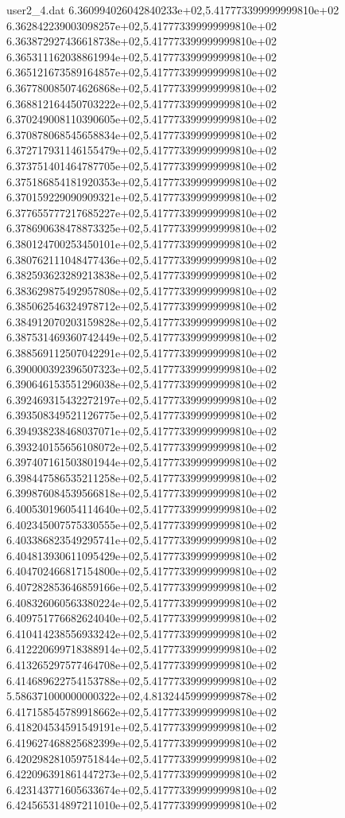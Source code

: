 \begin{filecontents}{user2_4.dat}
6.360994026042840233e+02,5.417773399999999810e+02
6.362842239003098257e+02,5.417773399999999810e+02
6.363872927436618738e+02,5.417773399999999810e+02
6.365311162038861994e+02,5.417773399999999810e+02
6.365121673589164857e+02,5.417773399999999810e+02
6.367780085074626868e+02,5.417773399999999810e+02
6.368812164450703222e+02,5.417773399999999810e+02
6.370249008110390605e+02,5.417773399999999810e+02
6.370878068545658834e+02,5.417773399999999810e+02
6.372717931146155479e+02,5.417773399999999810e+02
6.373751401464787705e+02,5.417773399999999810e+02
6.375186854181920353e+02,5.417773399999999810e+02
6.370159229090909321e+02,5.417773399999999810e+02
6.377655777217685227e+02,5.417773399999999810e+02
6.378690638478873325e+02,5.417773399999999810e+02
6.380124700253450101e+02,5.417773399999999810e+02
6.380762111048477436e+02,5.417773399999999810e+02
6.382593623289213838e+02,5.417773399999999810e+02
6.383629875492957808e+02,5.417773399999999810e+02
6.385062546324978712e+02,5.417773399999999810e+02
6.384912070203159828e+02,5.417773399999999810e+02
6.387531469360742449e+02,5.417773399999999810e+02
6.388569112507042291e+02,5.417773399999999810e+02
6.390000392396507323e+02,5.417773399999999810e+02
6.390646153551296038e+02,5.417773399999999810e+02
6.392469315432272197e+02,5.417773399999999810e+02
6.393508349521126775e+02,5.417773399999999810e+02
6.394938238468037071e+02,5.417773399999999810e+02
6.393240155656108072e+02,5.417773399999999810e+02
6.397407161503801944e+02,5.417773399999999810e+02
6.398447586535211258e+02,5.417773399999999810e+02
6.399876084539566818e+02,5.417773399999999810e+02
6.400530196054114640e+02,5.417773399999999810e+02
6.402345007575330555e+02,5.417773399999999810e+02
6.403386823549295741e+02,5.417773399999999810e+02
6.404813930611095429e+02,5.417773399999999810e+02
6.404702466817154800e+02,5.417773399999999810e+02
6.407282853646859166e+02,5.417773399999999810e+02
6.408326060563380224e+02,5.417773399999999810e+02
6.409751776682624040e+02,5.417773399999999810e+02
6.410414238556933242e+02,5.417773399999999810e+02
6.412220699718388914e+02,5.417773399999999810e+02
6.413265297577464708e+02,5.417773399999999810e+02
6.414689622754153788e+02,5.417773399999999810e+02
5.586371000000000322e+02,4.813244599999999878e+02
6.417158545789918662e+02,5.417773399999999810e+02
6.418204534591549191e+02,5.417773399999999810e+02
6.419627468825682399e+02,5.417773399999999810e+02
6.420298281059751844e+02,5.417773399999999810e+02
6.422096391861447273e+02,5.417773399999999810e+02
6.423143771605633674e+02,5.417773399999999810e+02
6.424565314897211010e+02,5.417773399999999810e+02

\end{filecontents}
